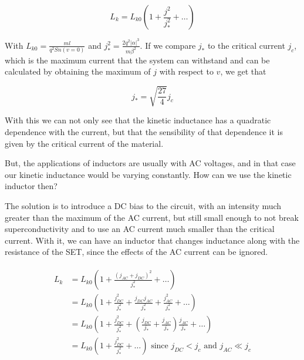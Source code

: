\documentclass[../main.tex]{subfiles}
\begin{document}
\begin{equation}
\label{eq:KineticNonLineality}
    L_{k} = L_{k0}\left(1 + \frac{j^2}{j_{*}^2} + \dots\right)
\end{equation}

With \(L_{k0} = \frac{ml}{q^2Sn(v=0)}\) and \(j_{*}^2 =
\frac{2q^2|\alpha|^3}{m\beta^2}\). If we compare \(j_{*}\)
to the critical current \(j_{c}\), which is the maximum current that
the system can withstand and can be calculated by obtaining the maximum of
\(j\) with respect to \(v\), we get that

\begin{equation*}
    j_{*} = \sqrt{\frac{27}{4}}j_{c}
\end{equation*}

With this we can not only see that the kinetic inductance has a quadratic
dependence with the current, but that the sensibility of that dependence it is
given by the critical current of the material.

But, the applications of inductors are usually with AC voltages, and in that
case our kinetic inductance would be varying constantly. How can we use the
kinetic inductor then?

The solution is to introduce a DC bias to the circuit, with an intensity much
greater than the maximum of the AC current, but still small enough to not break
superconductivity and to use an AC current much smaller than the critical current.
With it, we can have an inductor that changes inductance along with the resistance
of the SET, since the effects of the AC current can be ignored.

\begin{align*}
\begin{split}
L_{k} &= L_{k0}\left(1 + \frac{(j_{AC} + j_{DC})^2}{j_{*}^2} + \dots\right)\\
      &= L_{k0}\left(1 + \frac{j_{DC}^2}{j_{*}^2} + \frac{j_{DC}j_{AC}}{j_{*}^2} + 
      \frac{j_{AC}^2}{j_{*}^2} + \dots\right)\\
      &= L_{k0}\left(1 + \frac{j_{DC}^2}{j_{*}^2} + (\frac{j_{DC}}{j_{*}} + 
      \frac{j_{AC}}{j_{*}})\frac{j_{AC}}{j_{*}} + \dots\right)\\
      &= L_{k0}\left(1 + \frac{j_{DC}^2}{j_{*}^2} + \dots\right)
      \text{ since \(j_{DC} < j_{c}\) and \(j_{AC} \ll j_{c}\)}
\end{split}
\end{align*}
\end{document}
